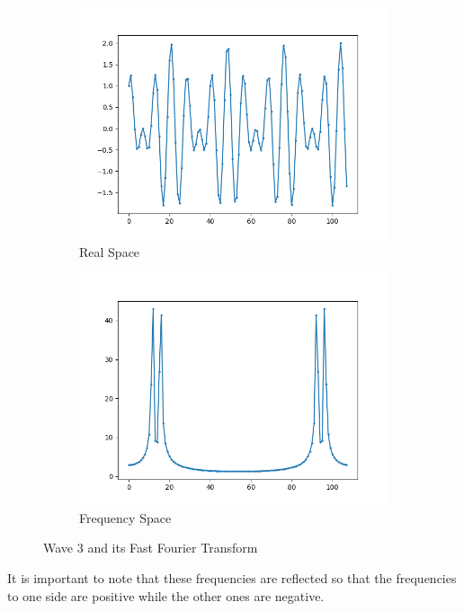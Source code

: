 \documentclass{amsproc}
\begin{document}
\begin{figure}[h]
\centering
\begin{subfigure}{.4\textwidth}
	\centering
	\includegraphics[scale=.25]{images/FFTOriginal3.png}
	\caption{Real Space}
	\label{fig:sub3}
\end{subfigure} %
\begin{subfigure}{.4\textwidth}
	\centering
	\includegraphics[scale=.25]{images/FFTResult3.png}
	\caption{Frequency Space}
	\label{fig:sub4}
\end{subfigure}
\caption{Wave 3 and its Fast Fourier Transform}
\label{fig:text3}
\end{figure}

It is important to note that these frequencies are reflected so that the frequencies to one side are positive while the other ones are negative.
\end{document}
